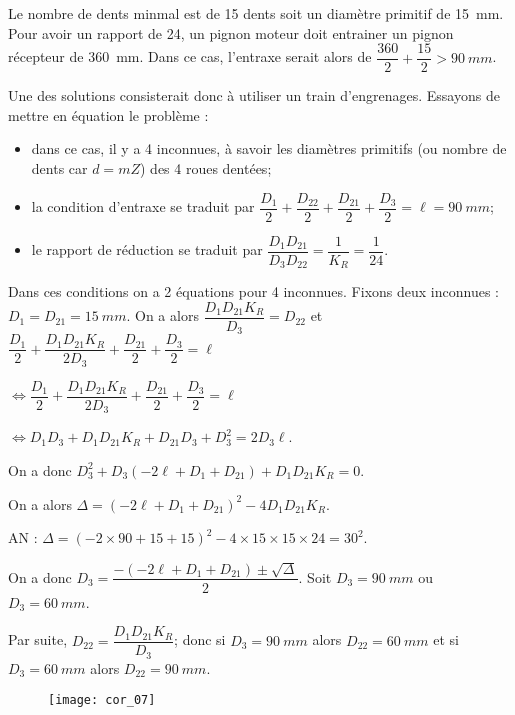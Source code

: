\ifprof
\begin{corrige}
Le nombre de dents minmal est de 15 dents soit un diamètre primitif de \SI{15}{mm}.
Pour avoir un rapport de 24, un pignon moteur doit entrainer un pignon récepteur de \SI{360}{mm}. Dans ce cas, l'entraxe serait alors de $\dfrac{360}{2}+\dfrac{15}{2} > \SI{90}{mm}$.

Une des solutions consisterait donc à utiliser un train d'engrenages. Essayons de mettre en équation le problème : 
\begin{itemize}
\item dans ce cas, il y a 4 inconnues, à savoir les diamètres primitifs (ou nombre de dents car $d=mZ$) des 4 roues dentées;
\item la condition d'entraxe se traduit par $\dfrac{D_1}{2} + \dfrac{D_{22}}{2}+ \dfrac{D_{21}}{2}+ \dfrac{D_{3}}{2} = \ell = \SI{90}{mm}$;
\item le rapport de réduction se traduit par $\dfrac{D_1 D_{21}}{D_3 D_{22}} = \dfrac{1}{K_R}= \dfrac{1}{24}$.
\end{itemize}
Dans ces conditions on a 2 équations pour 4 inconnues. Fixons deux inconnues : $D_1 =  D_{21} = \SI{15}{mm}$. 
On a alors $\dfrac{D_1 D_{21} K_R}{D_3 } = D_{22}$ et 
 $\dfrac{D_1}{2} + \dfrac{D_1 D_{21} K_R}{2D_3 }+ \dfrac{D_{21}}{2}+ \dfrac{D_{3}}{2} = \ell$

$ \Leftrightarrow  \dfrac{D_1}{2} + \dfrac{D_1 D_{21} K_R}{2D_3 }+ \dfrac{D_{21}}{2}+ \dfrac{D_{3}}{2} = \ell$

$ \Leftrightarrow  D_1 D_3  + D_1 D_{21} K_R+D_{21}D_3 + D_{3}^2 = 2 D_3\ell$.

On a donc $D_{3}^2 + D_3\left(- 2\ell + D_1+ D_{21} \right) + D_1 D_{21} K_R= 0$.

On a alors  $ \Delta  = \left(- 2\ell + D_1+ D_{21} \right)^2 - 4  D_1 D_{21} K_R$. 

AN : $\Delta = \left(- 2\times 90+ 15 + 15  \right)^2 - 4  \times 15\times 15 \times {24} = 30^2 $.

On a donc $D_3 = \dfrac{-\left(- 2\ell + D_1+ D_{21} \right)\pm\sqrt{\Delta}}{2}$.
Soit $D_3 = \SI{90}{mm}$ ou $D_3 = \SI{60}{mm}$.

Par suite,  $D_{22}=\dfrac{D_1 D_{21} K_R}{D_3 }$; donc 
 si $D_3 = \SI{90}{mm}$ alors $D_{22}=\SI{60}{mm} $
et  si $D_3 = \SI{60}{mm}$ alors $D_{22}= \SI{90}{mm}$.


\begin{figure}[H]
\centering
\texttt{[image: cor\_07]}
\end{figure}


\end{corrige}
\else
\fi



